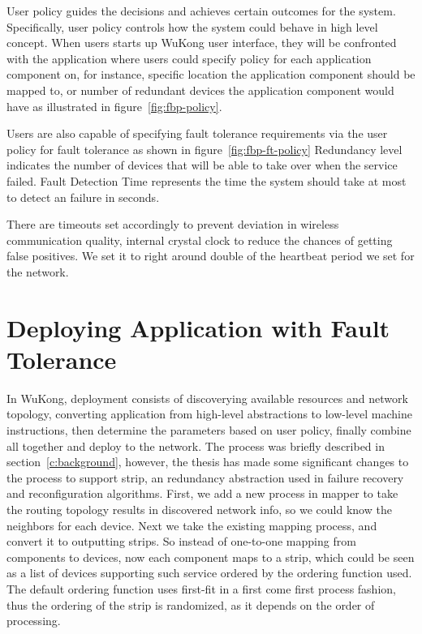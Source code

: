 User policy guides the decisions and achieves certain outcomes for the system.
Specifically, user policy controls how the system could behave in high level
concept.
When users starts up WuKong user interface, they will be confronted with the
application where users could specify policy for each application component on,
for instance, specific location the application component should be mapped to,
or number of redundant devices the application component would have as
illustrated in figure~\ref{fig:fbp-policy}.

Users are also capable of specifying fault tolerance requirements via the
user policy for fault tolerance as shown in figure~\ref{fig:fbp-ft-policy}
Redundancy level indicates the number of devices that will be able to take over
when the service failed. Fault Detection Time represents the time the system
should take at most to detect an failure in seconds.

There are timeouts set accordingly to prevent deviation in wireless communication quality,
internal crystal clock to reduce the chances of getting false positives. 
We set it to right around double of the heartbeat period we set for the network.

\section{Deploying Application with Fault Tolerance}

In WuKong, deployment consists of discoverying available resources and network
topology, converting application from high-level abstractions to low-level
machine instructions, then determine the parameters based on user policy,
finally combine all together and deploy to the network. The process was briefly
described in section~\ref{c:background}, however, the thesis has made some
significant changes to the process to support strip, an redundancy abstraction
used in failure recovery and reconfiguration algorithms. First, we add a new
process in mapper to take the routing topology results in discovered network
info, so we could know the neighbors for each device. Next we take the existing
mapping process, and convert it to outputting strips. So instead of one-to-one
mapping from components to devices, now each component maps to a strip, which
could be seen as a list of devices supporting such service ordered by the
ordering function used. The default ordering function uses first-fit in a first
come first process fashion, thus the ordering of the strip is randomized, as it
depends on the order of processing.

